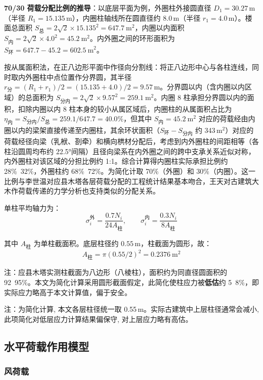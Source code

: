 \documentclass[12pt,a4paper,UTF8]{ctexart}
\begin{document}
\textbf{70/30 荷载分配比例的推导}：以底层平面为例，外圈柱外接圆直径 $D_1 = 30.27$\,m（半径 $R_1 = 15.135$\,m），内圈柱轴线所在圆直径约 $8.0$\,m（半径 $r_1 = 4.0$\,m）。楼面总面积 $S_{\text{总}} = 2\sqrt{2} \times 15.135^2 = 647.7\ \text{m}^2$，内圈以内面积 $S_{\text{内}} = 2\sqrt{2} \times 4.0^2 = 45.2\ \text{m}^2$。内外圈之间的环形面积为 $S_{\text{环}} = 647.7 - 45.2 = 602.5\ \text{m}^2$。

按从属面积法，在正八边形平面中作径向分割线：将正八边形中心与各柱连线，同时取内外圈柱中点位置作分界圆，其半径 $r_{\text{分}} = (R_1 + r_1)/2 = (15.135 + 4.0)/2 = 9.57$\,m。分界圆以内（含内圈以内区域）的总面积为 $S_{\text{分内}} = 2\sqrt{2} \times 9.57^2 = 259.1\ \text{m}^2$。内圈 8 柱承担分界圆以内的面积，扣除内圈以内 8 柱本身的较小从属区域后，内圈柱的从属面积占比为 $\eta_{\text{内}} = S_{\text{分内}}/S_{\text{总}} = 259.1/647.7 = 40.0\%$，但其中 $S_{\text{内}} = 45.2\ \text{m}^2$ 对应的荷载经由内圈以内的梁架直接传递至内圈柱，其余环状面积（$S_{\text{环}}-S_{\text{分内}}$ 约 343\,m$^2$）对应的荷载经径向梁（乳栿、剳牵）和横向栱材分配后，考虑到内外圈柱的间距相等（各柱沿圆周均布约 22.5°间隔）且径向梁系在内外圈之间的跨中支承关系近似对称，内外圈柱对该区域的分担比例约 1:1。综合计算得内圈柱实际承担比例约 28\%~32\%，外圈柱约 68\%~72\%。为简化计取 70\%（外圈）和 30\%（内圈）。这一比例与李世温\cite{li1998}对应县木塔各层荷载分配的工程统计结果基本吻合，王天\cite{wang1992}对古建筑大木作荷载传递的力学分析也支持类似的分配关系。

单柱平均轴力为：
\[
    \sigma_i^{\text{外}} = \frac{0.7 N_i}{24 A_{\text{柱}}},\qquad
    \sigma_i^{\text{内}} = \frac{0.3 N_i}{8 A_{\text{柱}}}
\]

其中 $A_{\text{柱}}$ 为单柱截面积。底层柱径约 $0.55$\,m，柱截面为圆形，故：
\[
    A_{\text{柱}} = \pi (0.55/2)^2 = 0.2376\ \text{m}^2
\]

注：应县木塔实测柱截面为八边形（八棱柱），面积约为同直径圆面积的 92~95\%。本文为简化计算采用圆形截面假定，此简化使柱应力被\textbf{低估}约 5~8\%，即实际应力略高于本文计算值，偏于安全。

注：为简化计算, 本文各层柱径统一取 0.55\,m。实际古建筑中上层柱径通常会减小, 此项简化对低层应力计算结果偏保守, 对上层应力略有高估。

\subsection{水平荷载作用模型}

\subsubsection{风荷载}
\end{document}
